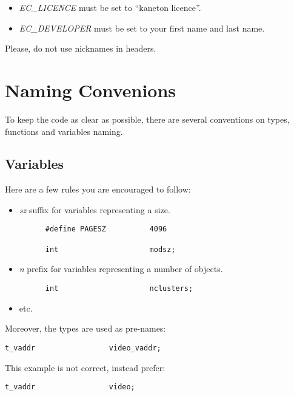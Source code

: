\begin{itemize}
  \item
    \textit{EC\_LICENCE} must be set to ``kaneton licence''.
  \item
    \textit{EC\_DEVELOPER} must be set to your first name and last name.
\end{itemize}

Please, do not use nicknames in headers.

%
%

\section{Naming Convenions}

To keep the code as clear as possible, there are several conventions on
types, functions and variables naming.

%
%

\subsection{Variables}

Here are a few rules you are encouraged to follow:

\begin{itemize}
  \item
    \textit{sz} suffix for variables representing a size.

    \begin{verbatim}
      #define PAGESZ          4096

      int                     modsz;
    \end{verbatim}
  \item
    \textit{n} prefix for variables representing a number of objects.

    \begin{verbatim}
      int                     nclusters;
    \end{verbatim}
  \item
    etc.
\end{itemize}

Moreover, the types are used as pre-names:

\begin{verbatim}
t_vaddr                 video_vaddr;
\end{verbatim}

This example is not correct, instead prefer:

\begin{verbatim}
t_vaddr                 video;
\end{verbatim}

